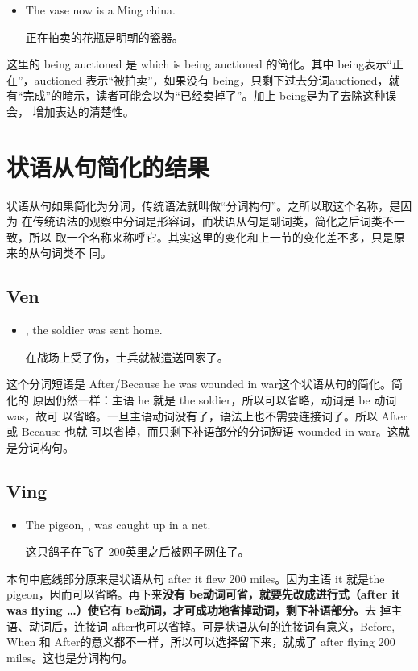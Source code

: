 \begin{itemize}
\item  The vase  now is a Ming china.

  正在拍卖的花瓶是明朝的瓷器。
\end{itemize}
这里的 being auctioned 是 which is being auctioned 的简化。其中 being表示“正
在”，auctioned 表示“被拍卖”，如果没有 being，只剩下过去分词auctioned，就
有“完成”的暗示，读者可能会以为“已经卖掉了”。加上 being是为了去除这种误会，
增加表达的清楚性。

\section{状语从句简化的结果}

状语从句如果简化为分词，传统语法就叫做“分词构句”。之所以取这个名称，是因为
在传统语法的观察中分词是形容词，而状语从句是副词类，简化之后词类不一致，所以
取一个名称来称呼它。其实这里的变化和上一节的变化差不多，只是原来的从句词类不
同。

\subsection{Ven}

\begin{itemize}
\item  {}, the soldier was sent home.

在战场上受了伤，士兵就被遣送回家了。
\end{itemize}
这个分词短语是 After/Because he was wounded in war这个状语从句的简化。简化的
原因仍然一样：主语 he 就是 the soldier，所以可以省略，动词是 be 动词was，故可
以省略。一旦主语动词没有了，语法上也不需要连接词了。所以 After或 Because 也就
可以省掉，而只剩下补语部分的分词短语 wounded in war。这就是分词构句。

\subsection{Ving}

\begin{itemize}
\item The pigeon, , was caught up in a net.

  这只鸽子在飞了 200英里之后被网子网住了。
\end{itemize}

本句中底线部分原来是状语从句 after it flew 200 miles。因为主语 it 就是the
pigeon，因而可以省略。再下来\textbf{没有 be动词可省，就要先改成进行式（after
  it was flying \ldots）使它有 be动词，才可成功地省掉动词，剩下补语部分。}去
掉主语、动词后，连接词 after也可以省掉。可是状语从句的连接词有意义，Before,
When 和 After的意义都不一样，所以可以选择留下来，就成了 after flying 200
miles。这也是分词构句。

